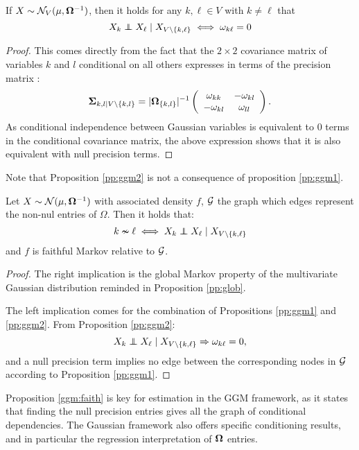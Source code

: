  \begin{prop}\label{pp:ggm2}If  $X\sim \mathcal{N}_V(\mu, {\boldsymbol{\Omega}}^{-1})$, then it holds for any $k,\ell\in V$ with $k\neq \ell$ that
$$X_k \independent X_\ell \mid X_{V\setminus\{k,\ell\}} \iff \omega_{k\ell}=0 $$
 \end{prop}
  \begin{proof}
  This comes directly from the fact that the $2\times 2$  covariance matrix of variables $k$ and $l$ conditional on all others expresses in terms of the precision matrix : $${\boldsymbol{\Sigma}}_{k,l\mid V\setminus\{k,l\}} = |{\boldsymbol{\Omega}}_{\{k,l\}}|^{-1} \left(\begin{array}{cc}
\omega_{kk} & -\omega_{kl}\\
-\omega_{kl} & \omega_{ll}  
  \end{array}\right).$$
  As conditional independence between Gaussian variables is equivalent to 0 terms in the conditional covariance matrix, the above expression shows that it is also equivalent with null precision terms.
  \end{proof}
  Note that Proposition \ref{pp:ggm2} is not a consequence of proposition \ref{pp:ggm1}.
\begin{prop}\label{ggm:faith}
 Let $X\sim \mathcal{N}(\mu, {\boldsymbol{\Omega}}^{-1})$ with associated density $f$, $\mathcal{G}$ the graph which edges represent the non-nul entries of $\Omega$. Then  it holds that:
 $$k\nsim \ell \iff  X_k \independent X_\ell \mid X_{V\setminus\{k,\ell\}} $$
 and $f$ is faithful Markov relative to $\mathcal{G}$.
\end{prop} 
\begin{proof}
The right implication is the global Markov property of the multivariate Gaussian distribution reminded in Proposition \ref{pp:glob}.

The left implication comes for the combination of Propositions \ref{pp:ggm1} and \ref{pp:ggm2}. From Proposition \ref{pp:ggm2}:
$$X_k \independent X_\ell \mid X_{V\setminus\{k,\ell\}} \Rightarrow \omega_{k\ell}=0,$$
and a null precision term implies no edge between the corresponding nodes in $\mathcal{G}$ according to  Proposition \ref{pp:ggm1}.
\end{proof}
Proposition \ref{ggm:faith} is key for estimation in the GGM framework, as it states that finding the null precision entries gives all the graph of conditional dependencies. The Gaussian framework also offers specific conditioning results, and in particular the regression interpretation of ${\boldsymbol{\Omega}}$ entries.

